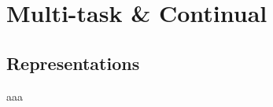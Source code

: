 
\section{Multi-task \& Continual }
\subsection{ Representations }
\begin{frame}
aaa
\end{frame}



    
